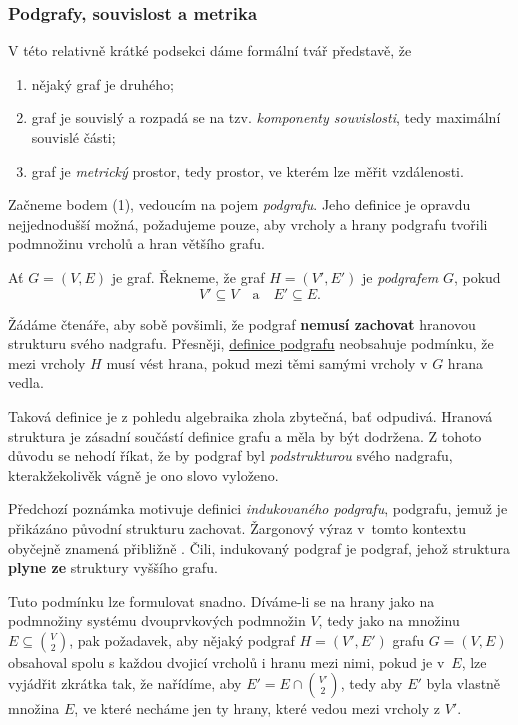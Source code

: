 \subsubsection{Podgrafy, souvislost a metrika}
\label{sssec:podgrafy-souvislost-a-metrika}

V této relativně krátké podsekci dáme formální tvář představě, že
\begin{enumerate}
 \item nějaký graf je  druhého;
 \item graf je souvislý a rozpadá se na tzv. \emph{komponenty souvislosti}, tedy
  maximální souvislé části;
 \item graf je \emph{metrický} prostor, tedy prostor, ve kterém lze měřit
  vzdálenosti.
\end{enumerate}

Začneme bodem (1), vedoucím na pojem \emph{podgrafu}. Jeho definice je opravdu
nejjednodušší možná, požadujeme pouze, aby vrcholy a hrany podgrafu tvořili
podmnožinu vrcholů a hran většího grafu.

\begin{definition}[Podgraf]
 \label{def:podgraf}
 Ať $G = (V,E)$ je graf. Řekneme, že graf $H = (V',E')$ je \emph{podgrafem} $G$,
 pokud
 \[
  V' \subseteq V \quad \text{a} \quad E' \subseteq E.
 \]
\end{definition}

\begin{remark}
 Žádáme čtenáře, aby sobě povšimli, že podgraf \textbf{nemusí zachovat} hranovou
 strukturu svého nadgrafu. Přesněji, \hyperref[def:podgraf]{definice podgrafu}
 neobsahuje podmínku, že mezi vrcholy $H$ musí vést hrana, pokud mezi těmi
 samými vrcholy v $G$ hrana vedla.

 Taková definice je z pohledu algebraika zhola zbytečná, bať odpudivá. Hranová
 struktura je zásadní součástí definice grafu a měla by být dodržena. Z tohoto
 důvodu se nehodí říkat, že by podgraf byl \emph{podstrukturou} svého nadgrafu,
 kterakžekolivěk vágně je ono slovo vyloženo.
\end{remark}

Předchozí poznámka motivuje definici \emph{indukovaného podgrafu}, podgrafu,
jemuž je přikázáno původní strukturu zachovat. Žargonový výraz 
v~tomto kontextu obyčejně znamená přibližně . Čili, indukovaný
podgraf je podgraf, jehož struktura \textbf{plyne ze} struktury vyššího grafu.

Tuto podmínku lze formulovat snadno. Díváme-li se na hrany jako na podmnožiny
systému dvouprvkových podmnožin $V$, tedy jako na množinu $E \subseteq
\binom{V}{2}$, pak požadavek, aby nějaký podgraf $H = (V',E')$ grafu $G = (V,E)$
obsahoval spolu s každou dvojicí vrcholů i hranu mezi nimi, pokud je v~$E$, lze
vyjádřit zkrátka tak, že nařídíme, aby $E' = E \cap \binom{V'}{2}$, tedy aby
$E'$ byla vlastně množina $E$, ve které necháme jen ty hrany, které vedou mezi
vrcholy z $V'$.

